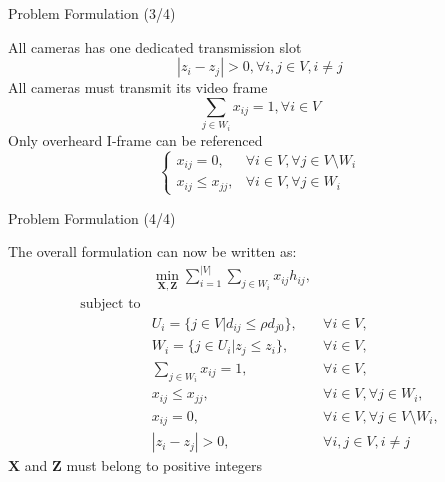 \begin{frame}{Problem Formulation (3/4)}
\begin{itemize}
	\myItem All cameras has one dedicated transmission slot
	\begin{equation}
		|z_i - z_j| > 0, \forall i,j \in V, i \neq j
		\label{eq::oneSlotOneCam}
	\end{equation}
	\myItem All cameras must transmit its video frame
	\begin{equation}
		\sum_{j \in W_i} x_{ij} = 1, \forall i \in V
		\label{eq::referenceConstraint}
	\end{equation}
	\myItem Only overheard I-frame can be referenced
	\begin{equation} \left\{ \begin{array}{ll}
		x_{ij} = 0, &\forall i \in V, \forall j \in V \setminus W_i \\
		x_{ij} \leq x_{jj}, &\forall i \in V, \forall j \in W_i \end{array} \right.
		\label{eq::referenceOnlyIframe}
	\end{equation}
\end{itemize}
\end{frame}
\begin{frame}{Problem Formulation (4/4)}
\begin{itemize}
	\myItem The overall formulation can now be written as:
	{\small	\begin{align}
		&\underset{\mathbf{X},\mathbf{Z}}{\min} \sum_{i=1}^{|V|} \sum_{j \in W_i}  x_{ij} h_{ij}, & \nonumber \\
\text{subject to} & & \nonumber \\
		&U_i = \{ j \in V | d_{ij} \leq \rho d_{j0} \}, &\forall i \in V, \nonumber \\
		&W_i = \{ j \in U_i | z_j \leq z_i \}, &\forall i \in V, \nonumber \\
		&\sum_{j \in W_i} x_{ij} = 1, &\forall i \in V, \nonumber \\
		&x_{ij} \leq x_{jj}, &\forall i \in V, \forall j \in W_i, \nonumber \\
		&x_{ij} = 0, &\forall i \in V, \forall j \in V \setminus W_i, \nonumber \\
		&|z_i - z_j| > 0, &\forall i,j \in V, i \neq j
\label{eq::formulation}
	\end{align} } %
	\myItem $\mathbf{X}$ and $\mathbf{Z}$ must belong to positive integers
\end{itemize}
\end{frame}